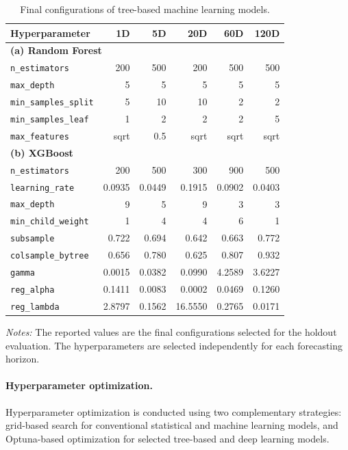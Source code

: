 \documentclass[runningheads,orivec]{llncs}
\begin{document}
\begin{table}[htbp]
\centering
\caption{Final configurations of tree-based machine learning models.}\label{tab:config_trees}
\setlength{\tabcolsep}{5pt}
\begin{tabular}{lrrrrr}
\hline
Hyperparameter & 1D & 5D & 20D & 60D & 120D \\
\hline
\multicolumn{6}{l}{\textbf{(a) Random Forest}} \\
\texttt{n\_estimators}      & 200    & 500    & 200    & 500    & 500 \\
\texttt{max\_depth}         & 5      & 5      & 5      & 5      & 5 \\
\texttt{min\_samples\_split}& 5      & 10     & 10     & 2      & 2 \\
\texttt{min\_samples\_leaf} & 1      & 2      & 2      & 2      & 5 \\
\texttt{max\_features}      & sqrt   & 0.5    & sqrt   & sqrt   & sqrt \\
\hline
\multicolumn{6}{l}{\textbf{(b) XGBoost}} \\
\texttt{n\_estimators}      & 200    & 500    & 300    & 900    & 500 \\
\texttt{learning\_rate}     & 0.0935 & 0.0449 & 0.1915 & 0.0902 & 0.0403 \\
\texttt{max\_depth}         & 9      & 5      & 9      & 3      & 3 \\
\texttt{min\_child\_weight} & 1      & 4      & 4      & 6      & 1 \\
\texttt{subsample}          & 0.722  & 0.694  & 0.642  & 0.663  & 0.772 \\
\texttt{colsample\_bytree}  & 0.656  & 0.780  & 0.625  & 0.807  & 0.932 \\
\texttt{gamma}              & 0.0015 & 0.0382 & 0.0990 & 4.2589 & 3.6227 \\
\texttt{reg\_alpha}         & 0.1411 & 0.0083 & 0.0002 & 0.0469 & 0.1260 \\
\texttt{reg\_lambda}        & 2.8797 & 0.1562 & 16.5550 & 0.2765 & 0.0171 \\
\hline
\end{tabular}
\par\vspace{4pt}\parbox{\linewidth}{\scriptsize\textit{Notes:} The reported values are the final configurations selected for the holdout evaluation. The hyperparameters are selected independently for each forecasting horizon.}
\end{table}

\paragraph{Hyperparameter optimization.} Hyperparameter optimization is conducted using two complementary strategies: grid-based search for conventional statistical and machine learning models, and Optuna-based optimization for selected tree-based and deep learning models.
\end{document}
